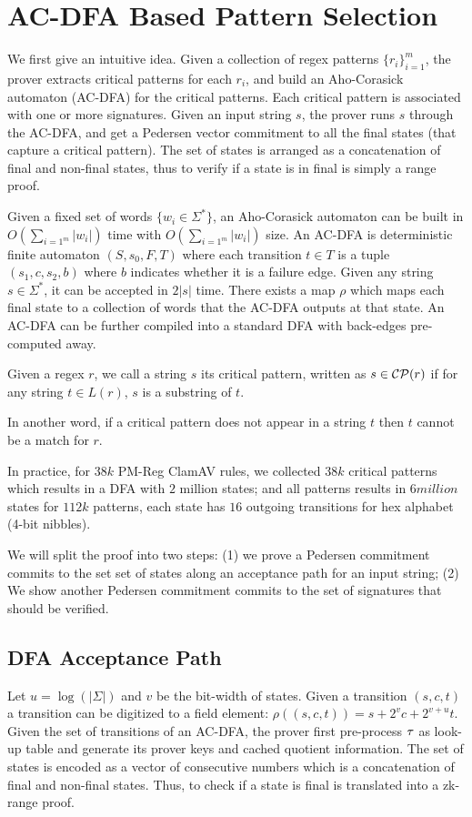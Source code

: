 \section{AC-DFA Based Pattern Selection}
We first give an intuitive idea. Given a collection of
regex patterns $\{r_i\}_{i=1}^m$, the prover extracts
critical patterns for each $r_i$, and build an Aho-Corasick
automaton (AC-DFA) for the critical patterns. Each critical
pattern is associated with one or more signatures.
Given an input string $s$, the prover runs $s$ through
the AC-DFA, and get a Pedersen vector commitment to
all the final states (that capture a critical pattern).
The set of states is arranged as a concatenation of
final and non-final states, thus to verify if a state
is in final is simply a range proof.

Given a fixed set of words $\{w_i \in \Sigma^*\}$,
an Aho-Corasick automaton can be built in $O(\sum_{i=1^m} |w_i|)$ time
with $O(\sum_{i=1^m} |w_i|)$ size. An AC-DFA is deterministic
finite automaton $(S, s_0, F, T)$ where each transition $t\in T$ is a tuple
$(s_1, c, s_2, b)$ where $b$ indicates whether it is a failure edge.
Given any string $s \in \Sigma^*$, it can be accepted in 
$2|s|$ time. There exists a map $\rho$ which maps each final
state to a collection of words that the AC-DFA outputs at that state.
An AC-DFA can be further compiled into a standard
DFA with back-edges pre-computed away. 


\begin{definition} Given a regex $r$, we call a string $s$
its critical pattern, written as $s \in \mathcal{CP}(r)$ if
for any string $t \in L(r)$, $s$ is a substring of $t$.
\end{definition}

In another word, if a critical pattern does not appear in a string
$t$ then $t$ cannot be a match for $r$.

In practice, for $38k$ PM-Reg ClamAV rules, we collected 
$38k$ critical patterns which results in a DFA with
$2$ million states; and all patterns results in $6 million$
states for $112k$ patterns, each state has $16$ outgoing transitions
for hex alphabet (4-bit nibbles).

We will split the proof into two steps: (1) we prove a 
Pedersen commitment commits to the set set of states along
an acceptance path for an input string; (2) 
We show another Pedersen commitment commits to
the set of signatures that should be verified.

\subsection{DFA Acceptance Path}
Let $u = \log(|\Sigma|)$ and $v$ be the bit-width of
states. Given a transition $(s, c, t)$ 
 a transition can be digitized to a field element:
$\rho( (s, c, t) ) = s + 2^v c + 2^{v+u} t$.
Given the set of transitions of an AC-DFA, the
prover first pre-process ${{\mathbf {\tau}}}$ as look-up table
and generate its prover keys and cached quotient information.
The set of states is encoded as a vector of consecutive numbers
which is a concatenation of final and non-final states.
Thus, to check if a state is final is translated into
a zk-range proof.

